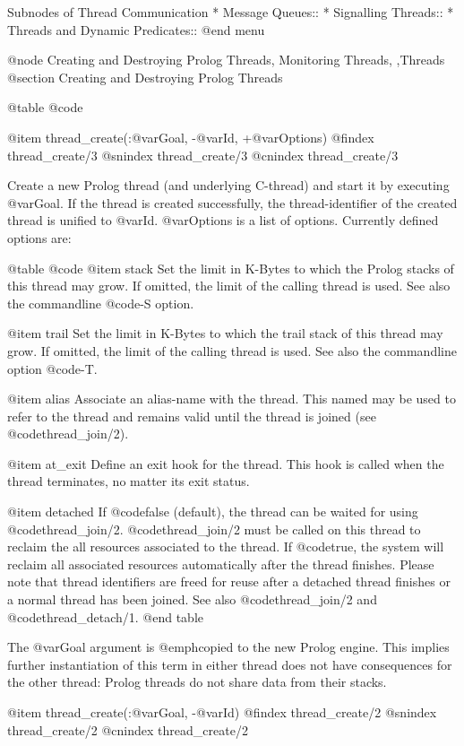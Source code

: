 {{{{{{{{{Subnodes of Thread Communication
* Message Queues::
* Signalling Threads::            
* Threads and Dynamic Predicates::   
@end menu

@node Creating and Destroying Prolog Threads, Monitoring Threads, ,Threads
@section Creating and Destroying Prolog Threads

@table @code

@item thread_create(:@var{Goal}, -@var{Id}, +@var{Options})
@findex thread_create/3
@snindex thread_create/3
@cnindex thread_create/3

Create a new Prolog thread (and underlying C-thread) and start it
by executing @var{Goal}.  If the thread is created successfully, the
thread-identifier of the created thread is unified to @var{Id}.
@var{Options} is a list of options.  Currently defined options are:

@table @code
    @item stack
Set the limit in K-Bytes to which the Prolog stacks of
this thread may grow.  If omitted, the limit of the calling thread is
used.  See also the  commandline @code{-S} option.

    @item trail
Set the limit in K-Bytes to which the trail stack of this thread may
grow.  If omitted, the limit of the calling thread is used. See also the
commandline option @code{-T}.

    @item alias
Associate an alias-name with the thread.  This named may be used to
refer to the thread and remains valid until the thread is joined
(see @code{thread_join/2}).

    @item at_exit
Define an exit hook for the thread.  This hook is called when the thread
terminates, no matter its exit status.

    @item detached
If @code{false} (default), the thread can be waited for using
@code{thread_join/2}. @code{thread_join/2} must be called on this thread
to reclaim the all resources associated to the thread. If @code{true},
the system will reclaim all associated resources automatically after the
thread finishes. Please note that thread identifiers are freed for reuse
after a detached thread finishes or a normal thread has been joined.
See also @code{thread_join/2} and @code{thread_detach/1}.
@end table

The @var{Goal} argument is @emph{copied} to the new Prolog engine.
This implies further instantiation of this term in either thread does
not have consequences for the other thread: Prolog threads do not share
data from their stacks.

@item thread_create(:@var{Goal}, -@var{Id})
@findex thread_create/2
@snindex thread_create/2
@cnindex thread_create/2

}}}}}}}}}
